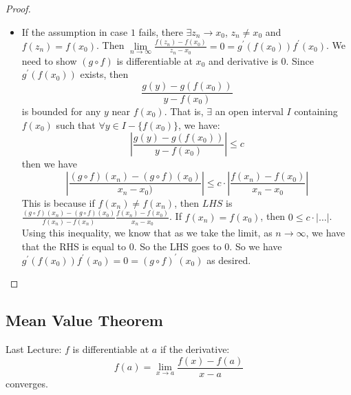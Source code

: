 \documentclass{report}
\begin{document}
\begin{proof}
\begin{itemize}
                \item If the assumption in case $1$ fails, there $\exists z_{n} \rightarrow x_{0}$, $z_{n} \neq x_{0}$ and $f(z_{n}) = f(x_{0})$. Then $\lim\limits_{n \to \infty}\frac{f(z_{n}) - f(x_{0})}{z_{n} - x_{0}} = 0 = g^{\prime}(f(x_{0}))f^{\prime}(x_{0})$. We need to show $(g \circ f)$ is differentiable at $x_{0}$ and derivative is $0$. Since $g^{\prime}(f(x_{0}))$ exists, then 
                    \begin{equation*}
                        \dfrac{g(y) - g(f(x_{0}))}{y - f(x_{0})}
                    \end{equation*}
                is bounded for any $y$ near $f(x_{0})$. That is, $\exists$ an open interval $I$ containing $f(x_{0})$ such that $\forall y \in I - \{f(x_{0})\}$, we have:
                    \begin{equation*}
                        \left\lvert \dfrac{g(y) - g(f(x_{0}))}{y - f(x_{0})} \right\rvert  \leq c
                    \end{equation*}
                then we have 
                    \begin{equation*}
                        \left\lvert \dfrac{(g \circ f)(x_{n}) - (g \circ f)(x_{0})}{x_{n} - x_{0})} \right\rvert \leq c \cdot \left\lvert \dfrac{f(x_{n}) - f(x_{0})}{x_{n} - x_{0}} \right\rvert
                    \end{equation*}
                This is because if $f(x_{n}) \neq f(x_{n})$, then $LHS$ is $\frac{(g \circ f)(x_{n}) - (g \circ f)(x_{0})}{f(x_{n}) - f(x_{n})} \frac{f(x_{n}) - f(x_{0})}{x_{n} - x_{0}}$. If $f(x_{n}) = f(x_{0})$, then $0 \leq c \cdot \lvert \ldots \rvert$. Using this inequality, we know that as we take the limit, as $n \rightarrow \infty$, we have that the RHS is equal to $0$. So the LHS goes to $0$. So we have $g^{\prime}(f(x_{0}))f^{\prime}(x_{0}) = 0 = (g \circ f)^{\prime}(x_{0})$ as desired.
            \end{itemize}
    \end{proof}

\begin{topic}
    \section{Mean Value Theorem}
\end{topic}

Last Lecture: $f$ is differentiable at $a$ if the derivative:
    \begin{equation*}
        f(a) = \lim\limits_{x \to a}\dfrac{f(x) - f(a)}{x - a}
    \end{equation*}
converges.
\end{document}
